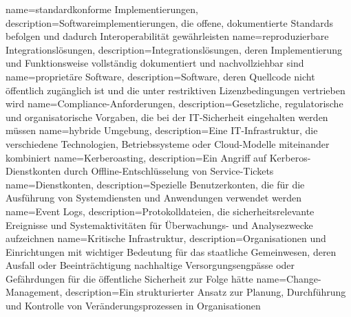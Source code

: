 {
	name={stan\-dard\-kon\-for\-me Im\-ple\-men\-tie\-run\-gen},
	description={Soft\-ware\-im\-ple\-men\-tie\-run\-gen, die of\-fe\-ne, do\-ku\-men\-tier\-te Stan\-dards be\-fol\-gen und da\-durch In\-ter\-ope\-ra\-bi\-li\-tät ge\-währ\-leis\-ten}
}
{
	name={re\-pro\-du\-zier\-ba\-re In\-te\-gra\-ti\-ons\-lö\-sun\-gen},
	description={In\-te\-gra\-ti\-ons\-lö\-sun\-gen, de\-ren Im\-ple\-men\-tie\-rung und Funk\-ti\-ons\-wei\-se voll\-stän\-dig do\-ku\-men\-tiert und nach\-voll\-zieh\-bar sind}
}
{
	name={pro\-prie\-tä\-re Soft\-ware},
	description={Soft\-ware, de\-ren Quell\-code nicht öf\-fent\-lich zu\-gäng\-lich ist und die un\-ter re\-strik\-ti\-ven Li\-zenz\-be\-din\-gun\-gen ver\-trie\-ben wird}
}
{
	name={Com\-pli\-ance-An\-for\-de\-run\-gen},
	description={Ge\-setz\-li\-che, re\-gu\-la\-to\-ri\-sche und or\-ga\-ni\-sa\-to\-ri\-sche Vor\-ga\-ben, die bei der IT-Si\-cher\-heit ein\-ge\-hal\-ten wer\-den müs\-sen}
}
{
	name={hy\-bri\-de Um\-ge\-bung},
	description={Eine IT-In\-fra\-struk\-tur, die ver\-schie\-de\-ne Tech\-no\-lo\-gi\-en, Be\-triebs\-sys\-te\-me oder Cloud-Mo\-del\-le mit\-ein\-an\-der kom\-bi\-niert}
}
{
	name={Ker\-be\-roas\-ting},
	description={Ein An\-griff auf Ker\-be\-ros-Dienst\-kon\-ten durch Off\-line-Ent\-schlüs\-se\-lung von Ser\-vice-Ti\-ckets}
}
{
	name={Dienst\-kon\-ten},
	description={Spe\-zi\-el\-le Be\-nut\-zer\-kon\-ten, die für die Aus\-füh\-rung von Sys\-tem\-diens\-ten und An\-wen\-dun\-gen ver\-wen\-det wer\-den}
}
{
	name={Event Logs},
	description={Pro\-to\-koll\-da\-tei\-en, die si\-cher\-heits\-re\-le\-van\-te Er\-eig\-nis\-se und Sys\-tem\-ak\-ti\-vi\-tä\-ten für Über\-wa\-chungs- und Ana\-ly\-se\-zwe\-cke auf\-zeich\-nen}
}
{
	name={Kri\-ti\-sche In\-fra\-struk\-tur},
	description={Or\-ga\-ni\-sa\-tio\-nen und Ein\-rich\-tun\-gen mit wich\-ti\-ger Be\-deu\-tung für das staat\-li\-che Ge\-mein\-we\-sen, de\-ren Aus\-fall oder Be\-ein\-träch\-ti\-gung nach\-hal\-ti\-ge Ver\-sor\-gungs\-eng\-päs\-se oder Ge\-fähr\-dun\-gen für die öf\-fent\-li\-che Si\-cher\-heit zur Fol\-ge hät\-te}
}
{
	name={Chan\-ge-Ma\-nage\-ment},
	description={Ein struk\-tu\-rier\-ter An\-satz zur Pla\-nung, Durch\-füh\-rung und Kon\-trol\-le von Ver\-än\-de\-rungs\-pro\-zes\-sen in Or\-ga\-ni\-sa\-tio\-nen}
}
